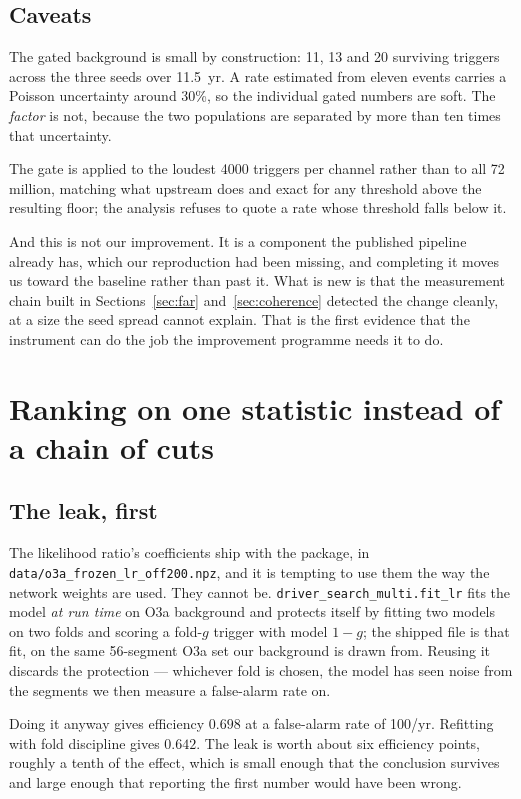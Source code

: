 \documentclass[11pt]{article}
\begin{document}
\subsection*{Caveats}

The gated background is small by construction: 11, 13 and 20 surviving triggers across
the three seeds over 11.5~yr. A rate estimated from eleven events carries a Poisson
uncertainty around 30\%, so the individual gated numbers are soft. The \emph{factor} is
not, because the two populations are separated by more than ten times that uncertainty.

The gate is applied to the loudest 4000 triggers per channel rather than to all 72
million, matching what upstream does and exact for any threshold above the resulting
floor; the analysis refuses to quote a rate whose threshold falls below it.

And this is not our improvement. It is a component the published pipeline already has,
which our reproduction had been missing, and completing it moves us toward the baseline
rather than past it. What is new is that the measurement chain built in
Sections~\ref{sec:far} and~\ref{sec:coherence} detected the change cleanly, at a size the
seed spread cannot explain. That is the first evidence that the instrument can do the job
the improvement programme needs it to do.

\section{Ranking on one statistic instead of a chain of cuts}
\label{sec:lr}

\subsection*{The leak, first}

The likelihood ratio's coefficients ship with the package, in
\texttt{data/o3a\_frozen\_lr\_off200.npz}, and it is tempting to use them the way the
network weights are used. They cannot be. \texttt{driver\_search\_multi.fit\_lr} fits the
model \emph{at run time} on O3a background and protects itself by fitting two models on
two folds and scoring a fold-$g$ trigger with model $1-g$; the shipped file is that fit,
on the same 56-segment O3a set our background is drawn from. Reusing it discards the
protection --- whichever fold is chosen, the model has seen noise from the segments we
then measure a false-alarm rate on.

Doing it anyway gives efficiency $0.698$ at a false-alarm rate of 100/yr. Refitting with
fold discipline gives $0.642$. The leak is worth about six efficiency points, roughly a
tenth of the effect, which is small enough that the conclusion survives and large enough
that reporting the first number would have been wrong.
\end{document}

